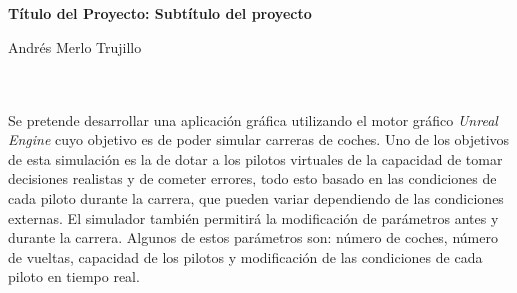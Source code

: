 \chapter*{}






\cleardoublepage
\thispagestyle{empty}

\begin{center}
{\large\bfseries Título del Proyecto: Subtítulo del proyecto}\\
\end{center}
\begin{center}
Andrés Merlo Trujillo\\
\end{center}

\\

\vspace{0.7cm}
\\

Se pretende desarrollar una aplicación gráfica utilizando el motor gráfico \textit{Unreal Engine} cuyo objetivo es de poder simular carreras de coches. Uno de los objetivos de esta simulación es la de dotar a los pilotos virtuales de la capacidad de tomar decisiones realistas y de cometer errores, todo esto basado en las condiciones de cada piloto durante la carrera, que pueden variar dependiendo de las condiciones externas. El simulador también permitirá la modificación de parámetros antes y durante la carrera. Algunos de estos parámetros son: número de coches, número de vueltas, capacidad de los pilotos y modificación de las condiciones de cada piloto en tiempo real.

\cleardoublepage


\thispagestyle{empty}


